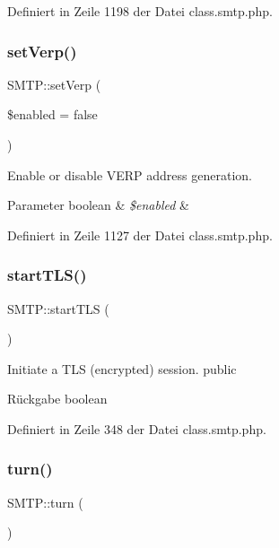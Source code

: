Definiert in Zeile 1198 der Datei class.\+smtp.\+php.

\mbox{\label{class_s_m_t_p_a8c80ad0d0e5c35fc48220ec09ea05c89}} 
\subsubsection{\texorpdfstring{set\+Verp()}{setVerp()}}
{\footnotesize\ttfamily S\+M\+T\+P\+::set\+Verp (\begin{DoxyParamCaption}\item[{}]{\$enabled = {\ttfamily false} }\end{DoxyParamCaption})}

Enable or disable V\+E\+RP address generation. 
\begin{DoxyParams}[1]{Parameter}
boolean & {\em \$enabled} & \\
\hline
\end{DoxyParams}


Definiert in Zeile 1127 der Datei class.\+smtp.\+php.

\mbox{\label{class_s_m_t_p_af073b18f8e00a63c94c04ac77b21343d}} 
\subsubsection{\texorpdfstring{start\+T\+L\+S()}{startTLS()}}
{\footnotesize\ttfamily S\+M\+T\+P\+::start\+T\+LS (\begin{DoxyParamCaption}{ }\end{DoxyParamCaption})}

Initiate a T\+LS (encrypted) session.  public \begin{DoxyReturn}{Rückgabe}
boolean 
\end{DoxyReturn}


Definiert in Zeile 348 der Datei class.\+smtp.\+php.

\mbox{\label{class_s_m_t_p_a23432be779cb9f81f0d87b71533d18da}} 
\subsubsection{\texorpdfstring{turn()}{turn()}}
{\footnotesize\ttfamily S\+M\+T\+P\+::turn (\begin{DoxyParamCaption}{ }\end{DoxyParamCaption})}

